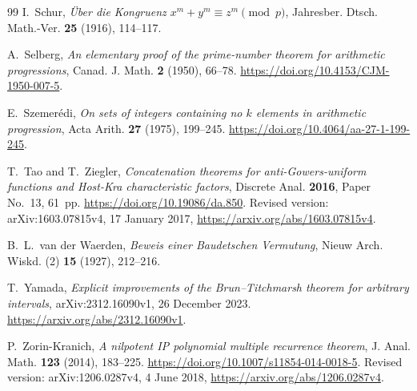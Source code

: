 \begin{thebibliography}{99}
I.~Schur,
\emph{\"Uber die Kongruenz $x^m+y^m\equiv z^m\pmod p$},
Jahresber. Dtsch. Math.-Ver. \textbf{25} (1916), 114--117.

A.~Selberg,
\emph{An elementary proof of the prime-number theorem for arithmetic progressions},
Canad. J. Math. \textbf{2} (1950), 66--78.
\url{https://doi.org/10.4153/CJM-1950-007-5}.

E.~Szemer\'edi,
\emph{On sets of integers containing no $k$ elements in arithmetic progression},
Acta Arith. \textbf{27} (1975), 199--245.
\url{https://doi.org/10.4064/aa-27-1-199-245}.

T.~Tao and T.~Ziegler,
\emph{Concatenation theorems for anti-Gowers-uniform functions and Host-Kra characteristic factors},
Discrete Anal. \textbf{2016}, Paper No.~13, 61~pp.
\url{https://doi.org/10.19086/da.850}.
Revised version: arXiv:1603.07815v4, 17 January 2017,
\url{https://arxiv.org/abs/1603.07815v4}.

B.~L.~van der Waerden,
\emph{Beweis einer Baudetschen Vermutung},
Nieuw Arch. Wiskd. (2) \textbf{15} (1927), 212--216.

T.~Yamada,
\emph{Explicit improvements of the Brun--Titchmarsh theorem for arbitrary intervals},
arXiv:2312.16090v1, 26 December 2023.
\url{https://arxiv.org/abs/2312.16090v1}.

P.~Zorin-Kranich,
\emph{A nilpotent IP polynomial multiple recurrence theorem},
J. Anal. Math. \textbf{123} (2014), 183--225.
\url{https://doi.org/10.1007/s11854-014-0018-5}.
Revised version: arXiv:1206.0287v4, 4 June 2018,
\url{https://arxiv.org/abs/1206.0287v4}.

\end{thebibliography}
